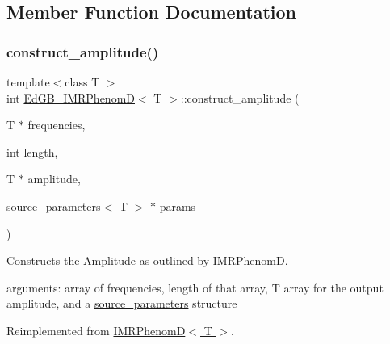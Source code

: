 \subsection{Member Function Documentation}
\mbox{\label{classEdGB__IMRPhenomD_ae845acb1900b80ce6b23952939f64f2a}} 
\subsubsection{\texorpdfstring{construct\+\_\+amplitude()}{construct\_amplitude()}}
{\footnotesize\ttfamily template$<$class T $>$ \\
int \hyperlink{classEdGB__IMRPhenomD}{Ed\+G\+B\+\_\+\+I\+M\+R\+PhenomD}$<$ T $>$\+::construct\+\_\+amplitude (\begin{DoxyParamCaption}\item[{T $\ast$}]{frequencies,  }\item[{int}]{length,  }\item[{T $\ast$}]{amplitude,  }\item[{\hyperlink{structsource__parameters}{source\+\_\+parameters}$<$ T $>$ $\ast$}]{params }\end{DoxyParamCaption})\hspace{0.3cm}{\ttfamily [virtual]}}



Constructs the Amplitude as outlined by \hyperlink{classIMRPhenomD}{I\+M\+R\+PhenomD}. 

arguments\+: array of frequencies, length of that array, T array for the output amplitude, and a \hyperlink{structsource__parameters}{source\+\_\+parameters} structure 

Reimplemented from \hyperlink{classIMRPhenomD_a95e7946061fa24fdb7a770dba02147be}{I\+M\+R\+Phenom\+D$<$ T $>$}.

\mbox{\label{classEdGB__IMRPhenomD_ad4a5d858678d07912f43e8a045f5979b}} 
